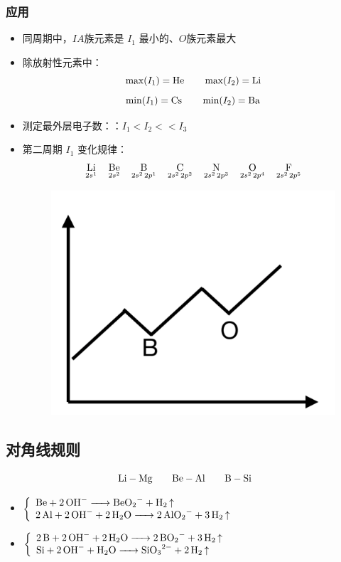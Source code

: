 \documentclass[a4paper]{article}
\begin{document}
	\subsubsection{应用}
	\begin{itemize}
		\item 同周期中，$IA$族元素是 $I_1$ 最小的、$O$族元素最大
		\item 除放射性元素中：
		$$\max(I_1)=\ce{He}\qquad\max(I_2)=\ce{Li}$$
		$$\min(I_1)=\ce{Cs}\qquad\min(I_2)=\ce{Ba}$$
		\item 测定最外层电子数：：$I_1<I_2<<I_3$
		\item 第二周期 $I_1$ 变化规律：
		$$\mathop{\ce{Li}}_{2s^1}\quad\mathop{\ce{Be}}_{2s^2}\quad\mathop{\ce{B}}_{2s^2\,2p^1}\quad\mathop{\ce{C}}_{2s^2\,2p^2}\quad\mathop{\ce{N}}_{2s^2\,2p^3}\quad\mathop{\ce{O}}_{2s^2\,2p^4}\quad\mathop{\ce{F}}_{2s^2\,2p^5}$$
		\begin{figure}[h]
		\centering
		\includegraphics[scale=0.12]{res/I1.pdf}
		\end{figure}
	\end{itemize}
	
	
	\subsection{对角线规则}
	$$
	\ce{Li}-\ce{Mg}\qquad\ce{Be}-\ce{Al}\qquad\ce{B}-\ce{Si}
	$$
	\begin{itemize}
		\item $\left\{\begin{array}{lr}
				\ce{Be + 2OH- -> BeO2- + H2 ^}\\
				\ce{2Al + 2OH- + 2H2O -> 2AlO2- + 3H2 ^}\\
			\end{array}\right.$
		\item $\left\{\begin{array}{lr}
				\ce{2B + 2OH- + 2H2O -> 2BO2- + 3H2 ^}\\
				\ce{Si + 2OH- + H2O -> SiO3^2- + 2H2 ^}\\
			\end{array}\right.$
	\end{itemize}
	
\end{document}

